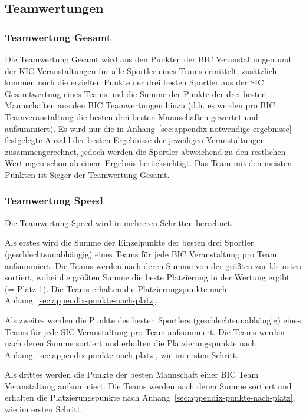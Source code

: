 \subsection{Teamwertungen}
\subsubsection{Teamwertung Gesamt}
\label{subsec:teamwertung-gesamt}
Die Teamwertung Gesamt wird aus den Punkten der BIC Veranstaltungen und der KIC Veranstaltungen für alle Sportler eines Teams ermittelt, zusätzlich kommen noch die erzielten Punkte der drei besten Sportler aus der SIC Gesamtwertung eines Teams und die Summe der Punkte der drei besten Mannschaften aus den BIC Teamwertungen hinzu (d.h. es werden pro BIC Teamveranstaltung die besten drei besten Mannschaften gewertet und aufsummiert). Es wird nur die in Anhang~\ref{sec:appendix-notwendige-ergebnisse} festgelegte Anzahl der besten Ergebnisse der jeweiligen Veranstaltungen zusammengerechnet, jedoch werden die Sportler abweichend zu den restlichen Wertungen schon ab einem Ergebnis berücksichtigt. Das Team mit den meisten Punkten ist Sieger der Teamwertung Gesamt.

\subsubsection{Teamwertung Speed}
\label{subsec:teamwertung-speed}
Die Teamwertung Speed wird in mehreren Schritten berechnet.

Als erstes wird die Summe der Einzelpunkte der besten drei Sportler (geschlechtsunabhängig) eines Teams für jede BIC Veranstaltung pro Team aufsummiert. Die Teams werden nach deren Summe von der größten zur kleinsten sortiert, wobei die größten Summe die beste Platzierung in der Wertung ergibt (= Platz 1). Die Teams erhalten die Platzierungspunkte nach Anhang~\ref{sec:appendix-punkte-nach-platz}.

Als zweites werden die Punkte des besten Sportlers (geschlechtsunabhängig) eines Teams für jede SIC Veranstaltung pro Team aufsummiert. Die Teams werden nach deren Summe sortiert und erhalten die Platzierungspunkte nach Anhang~\ref{sec:appendix-punkte-nach-platz}, wie im ersten Schritt.

Als drittes werden die Punkte der besten Mannschaft einer BIC Team Veranstaltung aufsummiert. Die Teams werden nach deren Summe sortiert und erhalten die Platzierungspunkte nach Anhang~\ref{sec:appendix-punkte-nach-platz}, wie im ersten Schritt.

